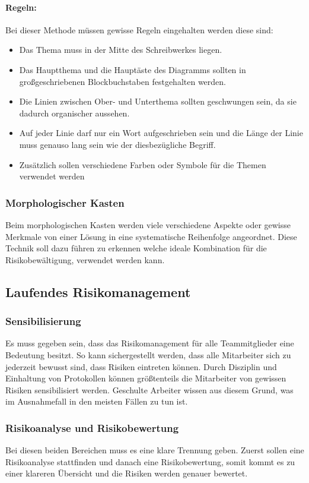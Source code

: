 \paragraph{Regeln:} Bei dieser Methode müssen gewisse Regeln eingehalten werden diese sind:
\begin{itemize}
	\item Das Thema muss in der Mitte des Schreibwerkes liegen.
	\item Das Hauptthema und die Hauptäste des Diagramms sollten in großgeschriebenen Blockbuchstaben festgehalten werden.
	\item Die Linien zwischen Ober- und Unterthema sollten geschwungen sein, da sie dadurch organischer aussehen.
	\item Auf jeder Linie darf nur ein Wort aufgeschrieben sein und die Länge der Linie muss genauso lang sein wie der diesbezügliche Begriff.
	\item Zusätzlich sollen verschiedene Farben oder Symbole für die Themen verwendet werden
\end{itemize}


\subsubsection{Morphologischer Kasten}
Beim morphologischen Kasten werden viele verschiedene Aspekte oder gewisse Merkmale von einer Lösung in eine systematische Reihenfolge angeordnet. Diese Technik soll dazu führen zu erkennen welche ideale Kombination für die Risikobewältigung, verwendet werden kann.

\subsection{Laufendes Risikomanagement}
\subsubsection{Sensibilisierung}
Es muss gegeben sein, dass das Risikomanagement für alle Teammitglieder eine Bedeutung besitzt. So kann sichergestellt werden, dass alle Mitarbeiter sich zu jederzeit bewusst sind, dass Risiken eintreten können. Durch Disziplin und Einhaltung von Protokollen können größtenteils die Mitarbeiter von gewissen Risiken sensibilisiert werden. Geschulte Arbeiter wissen aus diesem Grund, was im Ausnahmefall in den meisten Fällen zu tun ist.

\subsubsection{Risikoanalyse und Risikobewertung}
Bei diesen beiden Bereichen muss es eine klare Trennung geben. Zuerst sollen eine Risikoanalyse stattfinden und danach eine Risikobewertung, somit kommt es zu einer klareren Übersicht und die Risiken werden genauer bewertet.

